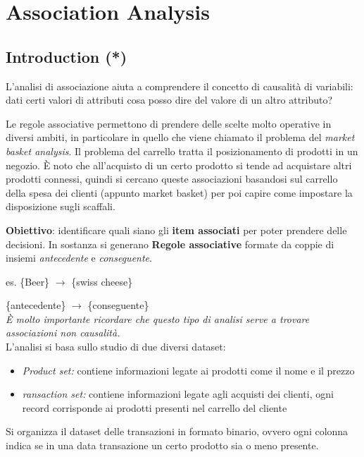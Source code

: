 \section{Association Analysis}
\subsection{Introduction (*)}

L'analisi di associazione aiuta a comprendere il concetto di causalità di variabili: dati certi valori di attributi cosa posso dire del valore di un altro attributo?

Le regole associative permettono di prendere delle scelte molto operative in diversi ambiti, in particolare in quello che viene chiamato il problema del \textit{market basket analysis}. 
Il problema del carrello tratta il posizionamento di prodotti in un negozio. \`E noto che all'acquisto di un certo prodotto si tende ad acquistare altri prodotti connessi, quindi si cercano queste associazioni basandosi sul carrello della spesa dei clienti (appunto market basket) per poi capire come impostare la disposizione sugli scaffali.

\textbf{Obiettivo}: identificare quali siano gli \textbf{item associati} per poter prendere delle decisioni. In sostanza si generano \textbf{Regole associative} formate da coppie di insiemi \textit{antecedente} e \textit{conseguente}.

es. \{Beer\} $\rightarrow$ \{swiss cheese\} 

\quad \{antecedente\} $\rightarrow$ \{conseguente\}\\
\textit{\`E molto importante ricordare che questo tipo di analisi serve a trovare associazioni non causalità.} \\
L'analisi si basa sullo studio di due diversi dataset:
\begin{itemize}
	\item \textit{Product set:} contiene informazioni legate ai prodotti come il nome e il prezzo
	\item \textit{ransaction set:} contiene informazioni legate agli acquisti dei clienti, ogni record corrisponde ai prodotti presenti nel carrello del cliente
\end{itemize}

Si organizza il dataset delle transazioni in formato binario, ovvero ogni colonna indica se in una data transazione un certo prodotto sia o meno presente.

